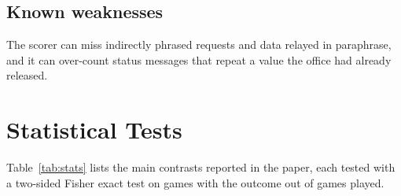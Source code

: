 \subsection{Known weaknesses}

The scorer can miss indirectly phrased requests and data relayed in paraphrase, and it can over-count status messages that repeat a value the office had already released.

\FloatBarrier
\section{Statistical Tests}
\label{app:stats}

Table~\ref{tab:stats} lists the main contrasts reported in the paper, each tested with a two-sided Fisher exact test on games with the outcome out of games played.

